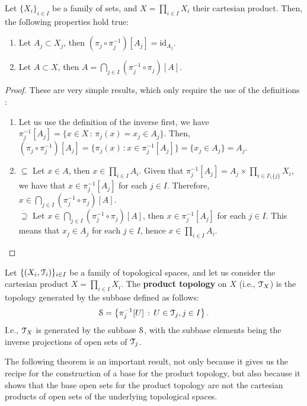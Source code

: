 \begin{lemma}
	\label{lem:projection}
	Let $\{X_i\}_{i\in I}$ be a family of sets, and $X=\prod_{i\in I} X_i$ their cartesian product.
	Then, the following properties hold true:
	\begin{enumerate}
		\item Let $A_j\subset X_j$, then $(\pi_j\circ\pi^{-1}_j)[A_j] = \text{id}_{A_j}$.
		\item Let $A\subset X$, then $A = \bigcap_{j\in I}(\pi_j^{-1}\circ\pi_j)[A]$.
	\end{enumerate}
\end{lemma}
\begin{proof}These are very simple results, which only require the use of the definitions :
	\begin{enumerate}
		\item Let us use the definition of the inverse first, we have $\pi_{j}^{-1}[A_j]=\{ x\in X\,:\,\pi_{j}(x)=x_j\in A_j\}$.
		Then, $(\pi_{j}\circ\pi_{j}^{-1})[A_j]=\{\pi_{j}(x)\,: x\in \pi_{j}^{-1}[A_j]\}=\{x_j\in A_j\} = A_j$.
		\item {$\boxed{\subseteq}$} Let $x\in A$, then $x\in \prod_{i\in I} A_i$. Given that $\pi_j^{-1}[A_j] = A_j\times\prod_{i\in I\setminus\{j\}}X_i$,
		we have that $x\in \pi_j^{-1}[A_j]$ for each $j\in I$. Therefore, $x\in \bigcap_{j\in I}(\pi_j^{-1}\circ\pi_j)[A]$.\\
		{$\boxed{\supseteq}$} Let $x \in \bigcap_{j\in I}(\pi_j^{-1}\circ\pi_j)[A]$, then $x\in \pi_j^{-1}[A_j]$ for each $j\in I$.
		This means that $x_j \in A_j$ for each $j\in I$, hence $x\in \prod_{i\in I} A_i$.
	\end{enumerate}
\end{proof}

\begin{definition}
	\label{def:product-topology}
	Let $\{(X_i, \T_i)\}_{i\in I}$ be a family of topological spaces, and
	let us consider the cartesian product $X=\prod_{i\in I} X_i$.
	The \textbf{product topology} on $X$ (i.e., $\T_{X}$) is the topology generated by the subbase
	defined as follows:
	$$
		\S = \setdef{\pi^{-1}_j[U]}{U\in\T_j, j\in I}.
	$$
	I.e., $\T_X$ is generated by the subbase $\S$, with the subbase elements
	being the inverse projections of open sets of $\T_j$.
\end{definition}

The following theorem is an important result, not only because it gives us the recipe
for the construction of a base for the product topology, but also because it shows that
the base open sets for the product topology are not the cartesian products of open sets
of the underlying topological spaces.


